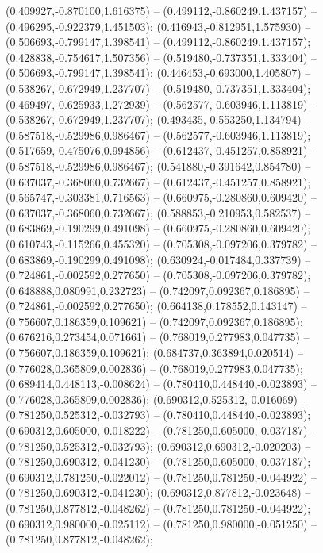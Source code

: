  (0.409927,-0.870100,1.616375) -- (0.499112,-0.860249,1.437157) -- (0.496295,-0.922379,1.451503);
 (0.416943,-0.812951,1.575930) -- (0.506693,-0.799147,1.398541) -- (0.499112,-0.860249,1.437157);
 (0.428838,-0.754617,1.507356) -- (0.519480,-0.737351,1.333404) -- (0.506693,-0.799147,1.398541);
 (0.446453,-0.693000,1.405807) -- (0.538267,-0.672949,1.237707) -- (0.519480,-0.737351,1.333404);
 (0.469497,-0.625933,1.272939) -- (0.562577,-0.603946,1.113819) -- (0.538267,-0.672949,1.237707);
 (0.493435,-0.553250,1.134794) -- (0.587518,-0.529986,0.986467) -- (0.562577,-0.603946,1.113819);
 (0.517659,-0.475076,0.994856) -- (0.612437,-0.451257,0.858921) -- (0.587518,-0.529986,0.986467);
 (0.541880,-0.391642,0.854780) -- (0.637037,-0.368060,0.732667) -- (0.612437,-0.451257,0.858921);
 (0.565747,-0.303381,0.716563) -- (0.660975,-0.280860,0.609420) -- (0.637037,-0.368060,0.732667);
 (0.588853,-0.210953,0.582537) -- (0.683869,-0.190299,0.491098) -- (0.660975,-0.280860,0.609420);
 (0.610743,-0.115266,0.455320) -- (0.705308,-0.097206,0.379782) -- (0.683869,-0.190299,0.491098);
 (0.630924,-0.017484,0.337739) -- (0.724861,-0.002592,0.277650) -- (0.705308,-0.097206,0.379782);
 (0.648888,0.080991,0.232723) -- (0.742097,0.092367,0.186895) -- (0.724861,-0.002592,0.277650);
 (0.664138,0.178552,0.143147) -- (0.756607,0.186359,0.109621) -- (0.742097,0.092367,0.186895);
 (0.676216,0.273454,0.071661) -- (0.768019,0.277983,0.047735) -- (0.756607,0.186359,0.109621);
 (0.684737,0.363894,0.020514) -- (0.776028,0.365809,0.002836) -- (0.768019,0.277983,0.047735);
 (0.689414,0.448113,-0.008624) -- (0.780410,0.448440,-0.023893) -- (0.776028,0.365809,0.002836);
 (0.690312,0.525312,-0.016069) -- (0.781250,0.525312,-0.032793) -- (0.780410,0.448440,-0.023893);
 (0.690312,0.605000,-0.018222) -- (0.781250,0.605000,-0.037187) -- (0.781250,0.525312,-0.032793);
 (0.690312,0.690312,-0.020203) -- (0.781250,0.690312,-0.041230) -- (0.781250,0.605000,-0.037187);
 (0.690312,0.781250,-0.022012) -- (0.781250,0.781250,-0.044922) -- (0.781250,0.690312,-0.041230);
 (0.690312,0.877812,-0.023648) -- (0.781250,0.877812,-0.048262) -- (0.781250,0.781250,-0.044922);
 (0.690312,0.980000,-0.025112) -- (0.781250,0.980000,-0.051250) -- (0.781250,0.877812,-0.048262);

